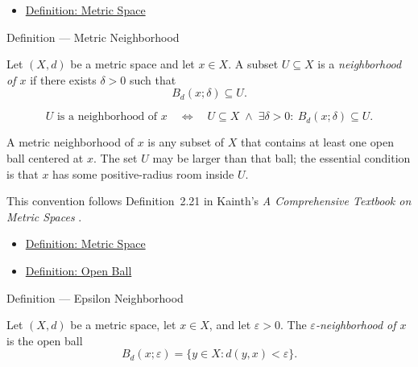 \begin{dependencies}
\begin{itemize}
  \item \hyperref[def:metric-space]{Definition: Metric Space}
\end{itemize}
\end{dependencies}

\begin{definitionbox}{Definition --- Metric Neighborhood}
\begin{definition}
\label{def:metric-neighborhood}
Let \((X,d)\) be a metric space and let \(x\in X\).  A subset \(U\subseteq X\)
is a \emph{neighborhood of \(x\)} if there exists \(\delta>0\) such that
\[
  B_d(x;\delta)\subseteq U.
\]
\end{definition}
\end{definitionbox}

\begin{remark*}
\[
U\text{ is a neighborhood of }x
\quad\Longleftrightarrow\quad
U\subseteq X
\;\land\;
\exists\delta>0{:}\ B_d(x;\delta)\subseteq U.
\]
\end{remark*}

\begin{remark*}[Interpretation]
A metric neighborhood of \(x\) is any subset of \(X\) that contains at least
one open ball centered at \(x\).  The set \(U\) may be larger than that ball;
the essential condition is that \(x\) has some positive-radius room inside
\(U\).
\end{remark*}

\begin{remark*}
This convention follows Definition~2.21 in Kainth's
\emph{A Comprehensive Textbook on Metric Spaces}
\cite{KainthComprehensiveMetricSpaces2023}.
\end{remark*}

\begin{dependencies}
\begin{itemize}
  \item \hyperref[def:metric-space]{Definition: Metric Space}
  \item \hyperref[def:metric-open-ball]{Definition: Open Ball}
\end{itemize}
\end{dependencies}

\begin{definitionbox}{Definition --- Epsilon Neighborhood}
\begin{definition}
\label{def:metric-epsilon-neighborhood}
Let \((X,d)\) be a metric space, let \(x\in X\), and let
\(\varepsilon>0\).  The \emph{\(\varepsilon\)-neighborhood of \(x\)} is the
open ball
\[
  B_d(x;\varepsilon)
  =
  \{y\in X:d(y,x)<\varepsilon\}.
\]
\end{definition}
\end{definitionbox}

